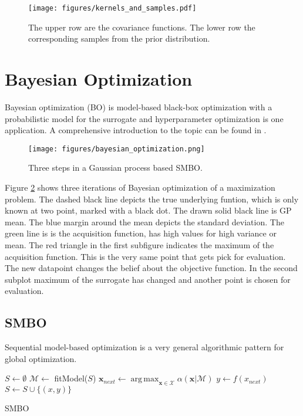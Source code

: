 \documentclass[english]{article}
\newcommand{\x}{\mathbf{x}}
\newcommand{\M}{\mathcal{M}}
\newcommand{\X}{\mathcal{X}}
\DeclareMathOperator*{\argmax}{arg\,max}
\begin{document}
\begin{figure}
  \texttt{[image: figures/kernels\_and\_samples.pdf]}
  \caption{The upper row are the covariance functions. The lower row the corresponding samples from the prior distribution.}
  \label{kernels}
\end{figure}

\newpage


\section{Bayesian Optimization}
Bayesian optimization (BO) is model-based black-box optimization with a probabilistic model for the surrogate and hyperparameter optimization is one application. A comprehensive introduction to the topic can be found in \cite{shahriari_taking_2016}.

\begin{figure}
  \texttt{[image: figures/bayesian\_optimization.png]}
  \caption{Three steps in a Gaussian process based SMBO.}
  \label{bayesian optimization}
\end{figure}

Figure \ref{bayesian optimization} shows three iterations of Bayesian optimization of a maximization problem. The dashed black line depicts the true underlying funtion, which is only known at two point, marked with a black dot. The drawn solid black line is GP mean. The blue margin around the mean depicts the standard deviation. The green line is is the acquisition function, has high values for high variance or mean. The red triangle in the first subfigure indicates the maximum of the acquisition function. This is the very same point that gets pick for evaluation. The new datapoint changes the belief about the objective function. In the second subplot maximum of the surrogate has changed and another point is chosen for evaluation.

\subsection{SMBO}
Sequential model-based optimization is a very general algorithmic pattern for global optimization.

\begin{algorithm}[H]
\SetAlgoLined

$S \leftarrow \emptyset$\;
{
  $\mathcal{M} \leftarrow$ fitModel($S$)\;
  $\x_{next} \leftarrow \argmax_{\x \in \X} \alpha(\x|\M)$\;
  $y \leftarrow f(x_{next})$\;
  $S \leftarrow S \cup \{(x,y)\}$\;
}
\caption{SMBO}
\end{algorithm}
\end{document}
